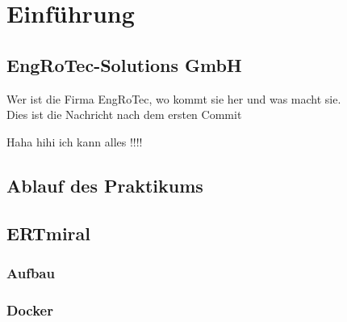 \chapter{Einführung}
\label{chp:Einführung}
 
\section{EngRoTec-Solutions GmbH}
Wer ist die Firma EngRoTec, wo kommt sie her und was macht sie. \\

Dies ist die Nachricht nach dem ersten Commit


Haha hihi ich kann alles !!!!
\section{Ablauf des Praktikums}

\newpage
\section{ERTmiral}
\subsection{Aufbau}
\subsection{Docker}